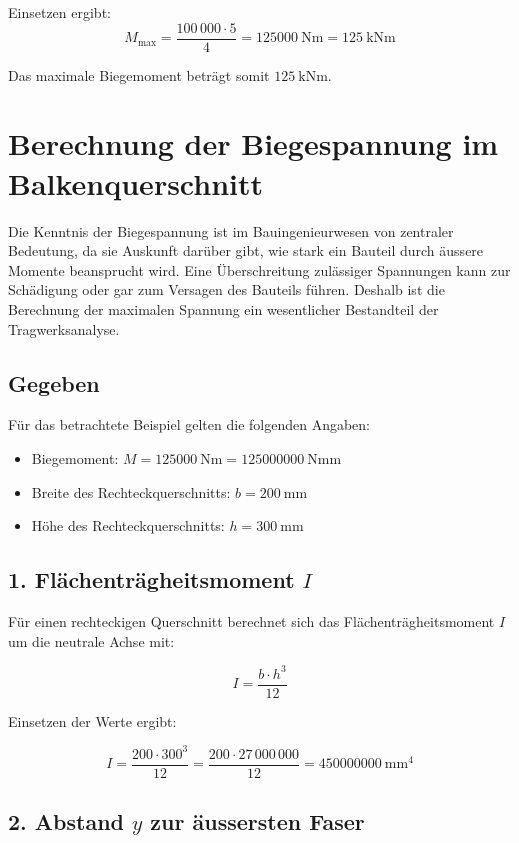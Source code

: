 	Einsetzen ergibt:
	\[
	M_\text{max} = \frac{100\,000 \cdot 5}{4} = \SI{125000}{\newton\meter} = \SI{125}{\kilo\newton\meter}
	\]
	
	Das maximale Biegemoment beträgt somit \(\boxed{\SI{125}{\kilo\newton\meter}}\).
	
	\section*{Berechnung der Biegespannung im Balkenquerschnitt}
	
	Die Kenntnis der Biegespannung ist im Bauingenieurwesen von zentraler Bedeutung, da sie Auskunft darüber gibt, wie stark ein Bauteil durch äussere Momente beansprucht wird. 
	Eine Überschreitung zulässiger Spannungen kann zur Schädigung oder gar zum Versagen des Bauteils führen. 
	Deshalb ist die Berechnung der maximalen Spannung ein wesentlicher Bestandteil der Tragwerksanalyse.
	
	\subsection*{Gegeben}
	
	Für das betrachtete Beispiel gelten die folgenden Angaben:
	
	\begin{itemize}
		\item Biegemoment: $M = \SI{125000}{\newton\meter} = \SI{125000000}{\newton\milli\meter}$
		\item Breite des Rechteckquerschnitts: $b = \SI{200}{\milli\meter}$
		\item Höhe des Rechteckquerschnitts: $h = \SI{300}{\milli\meter}$
	\end{itemize}
	
	\subsection*{1. Flächenträgheitsmoment $I$}
	
	Für einen rechteckigen Querschnitt berechnet sich das Flächenträgheitsmoment $I$ um die neutrale Achse mit:
	
	\[
	I = \frac{b \cdot h^3}{12}
	\]
	
	Einsetzen der Werte ergibt:
	
	\[
	I = \frac{200 \cdot 300^3}{12} = \frac{200 \cdot 27\,000\,000}{12} = \SI{450000000}{\milli\meter^4}
	\]
	
	\subsection*{2. Abstand $y$ zur äussersten Faser}
	
